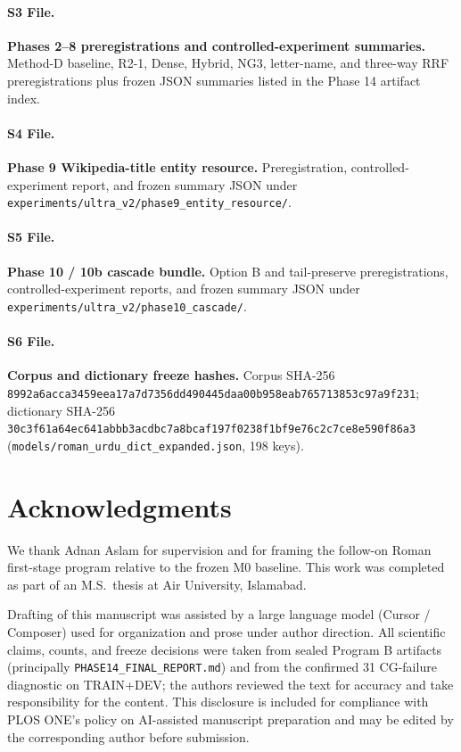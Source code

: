 \documentclass[10pt,letterpaper]{article}
\begin{document}
\paragraph*{S3 File.}
\label{S3_File}
\textbf{Phases 2--8 preregistrations and controlled-experiment summaries.} Method-D baseline, R2-1, Dense, Hybrid, NG3, letter-name, and three-way RRF preregistrations plus frozen JSON summaries listed in the Phase 14 artifact index.

\paragraph*{S4 File.}
\label{S4_File}
\textbf{Phase 9 Wikipedia-title entity resource.} Preregistration, controlled-experiment report, and frozen summary JSON under \texttt{experiments/ultra\_v2/phase9\_entity\_resource/}.

\paragraph*{S5 File.}
\label{S5_File}
\textbf{Phase 10 / 10b cascade bundle.} Option B and tail-preserve preregistrations, controlled-experiment reports, and frozen summary JSON under \texttt{experiments/ultra\_v2/phase10\_cascade/}.

\paragraph*{S6 File.}
\label{S6_File}
\textbf{Corpus and dictionary freeze hashes.} Corpus SHA-256 \texttt{8992a6acca3459eea17a7d7356dd490445daa00b958eab765713853c97a9f231}; dictionary SHA-256 \texttt{30c3f61a64ec641abbb3acdbc7a8bcaf197f0238f1bf9e76c2c7ce8e590f86a3} (\texttt{models/roman\_urdu\_dict\_expanded.json}, 198 keys).

\section*{Acknowledgments}

We thank Adnan Aslam for supervision and for framing the follow-on Roman first-stage program relative to the frozen M0 baseline. This work was completed as part of an M.S.\ thesis at Air University, Islamabad.

Drafting of this manuscript was assisted by a large language model (Cursor / Composer) used for organization and prose under author direction. All scientific claims, counts, and freeze decisions were taken from sealed Program B artifacts (principally \texttt{PHASE14\_FINAL\_REPORT.md}) and from the confirmed 31 CG-failure diagnostic on TRAIN+DEV; the authors reviewed the text for accuracy and take responsibility for the content. This disclosure is included for compliance with PLOS ONE's policy on AI-assisted manuscript preparation and may be edited by the corresponding author before submission.

\nolinenumbers


\end{document}
